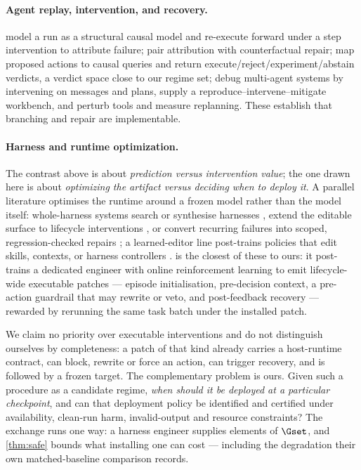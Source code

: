\paragraph{Agent replay, intervention, and recovery.}
\citet{causalagentreplay2026} model a run as a structural causal model and
re-execute forward under a step intervention to attribute failure;
\citet{causalflow2026} pair attribution with counterfactual repair;
\citet{civex2026} map proposed actions to causal queries and return
execute/reject/experiment/abstain verdicts, a verdict space close to our regime
set; \citet{dover2025} debug multi-agent systems by intervening on messages and
plans, \citet{agentcheck2026} supply a reproduce--intervene--mitigate workbench,
and \citet{whentoolsfail2026} perturb tools and measure replanning.  These
establish that branching and repair are implementable.

\paragraph{Harness and runtime optimization.}
The contrast above is about \emph{prediction versus intervention value}; the one
drawn here is about \emph{optimizing the artifact versus deciding when to deploy
it}.  A parallel literature optimises the runtime around a frozen model rather
than the model itself: whole-harness systems search or synthesise harnesses
\citep{metaharness2026,autoharness2026,ahe2026,harnessx2026}, extend the
editable surface to lifecycle interventions \citep{lifeharness2026}, or convert
recurring failures into scoped, regression-checked repairs
\citep{harnessfix2026,selfharness2026}; a learned-editor line post-trains
policies that edit skills, contexts, or harness controllers
\citep{skillr12026,codeskill2026,selfevolve2026,harnessbridge2026,
harnessrlcontrol2026,hase2026}.  \citet{harnessr12026} is the closest of these
to ours: it post-trains a dedicated engineer with online reinforcement learning
to emit lifecycle-wide executable patches --- episode initialisation,
pre-decision context, a pre-action guardrail that may rewrite or veto, and
post-feedback recovery --- rewarded by rerunning the same task batch under the
installed patch.

We claim no priority over executable interventions and do not distinguish
ourselves by completeness: a patch of that kind already carries a host-runtime
contract, can block, rewrite or force an action, can trigger recovery, and is
followed by a frozen target.  The complementary problem is ours.  Given such a
procedure as a candidate regime, \emph{when should it be deployed at a
particular checkpoint}, and can that deployment policy be identified and
certified under availability, clean-run harm, invalid-output and resource
constraints?  The exchange runs one way: a harness engineer supplies elements of
$\Gset$, and \cref{thm:safe} bounds what installing one can cost --- including
the degradation their own matched-baseline comparison records.

